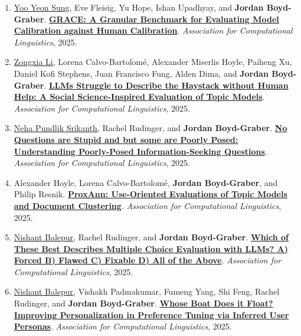 {\begin{enumerate}
	 \item \underline{\href{http://yysung.github.io/}{Yoo Yeon Sung}}, Eve Fleisig, Yu Hope, Ishan Upadhyay, and {\bf Jordan Boyd-Graber}.  {\bf \href{http://cs.umd.edu/~jbg//docs/2025_acl_grace.pdf}{GRACE: A Granular Benchmark for Evaluating Model Calibration against Human Calibration}}.  \emph{Association for Computational Linguistics}, 2025.

	 \item \underline{\href{https://zli12321.github.io/}{Zongxia Li}}, Lorena Calvo-Bartolom\'e, Alexander Miserlis Hoyle, Paiheng Xu, Daniel Kofi Stephens, Juan Francisco Fung, Alden Dima, and {\bf Jordan Boyd-Graber}.  {\bf \href{http://cs.umd.edu/~jbg//docs/2025_acl_bass.pdf}{LLMs Struggle to Describe the Haystack without Human Help: A Social Science-Inspired Evaluation of Topic Models}}.  \emph{Association for Computational Linguistics}, 2025.

	 \item \underline{\href{https://nehasrikn.github.io/}{Neha Pundlik Srikanth}}, Rachel Rudinger, and {\bf Jordan Boyd-Graber}.  {\bf \href{http://cs.umd.edu/~jbg//docs/2025_acl_badq.pdf}{No Questions are Stupid and but some are Poorly Posed: Understanding Poorly-Posed Information-Seeking Questions}}.  \emph{Association for Computational Linguistics}, 2025.

	 \item Alexander Hoyle, Lorena Calvo-Bartolom\'{e}, {\bf Jordan Boyd-Graber}, and Philip Resnik.  {\bf \href{http://cs.umd.edu/~jbg//docs/2025_acl_proxann.pdf}{ProxAnn: Use-Oriented Evaluations of Topic Models and Document Clustering}}.  \emph{Association for Computational Linguistics}, 2025.

	 \item \underline{\href{https://nbalepur.github.io/}{Nishant Balepur}}, Rachel Rudinger, and {\bf Jordan Boyd-Graber}.  {\bf \href{http://cs.umd.edu/~jbg//docs/2025_acl_mcqa_bad.pdf}{Which of These Best Describes Multiple Choice Evaluation with LLMs? A) Forced B) Flawed C) Fixable D) All of the Above}}.  \emph{Association for Computational Linguistics}, 2025.

	 \item \underline{\href{https://nbalepur.github.io/}{Nishant Balepur}}, Vishakh Padmakumar, Fumeng Yang, Shi Feng, Rachel Rudinger, and {\bf Jordan Boyd-Graber}.  {\bf \href{http://cs.umd.edu/~jbg//docs/2025_acl_boat.pdf}{Whose Boat Does it Float? Improving Personalization in Preference Tuning via Inferred User Personas}}.  \emph{Association for Computational Linguistics}, 2025.


\end{enumerate}}
